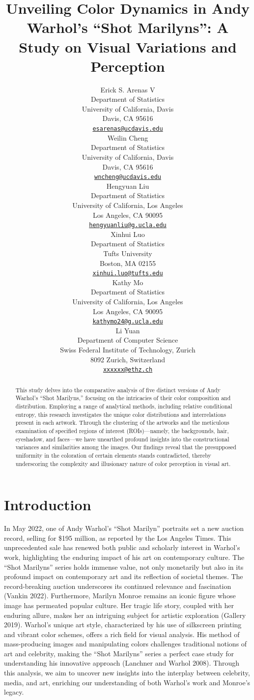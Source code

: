 \documentclass{article}
\title{Unveiling Color Dynamics in Andy Warhol's ``Shot Marilyns'': A
Study on Visual Variations and Perception}
\author{
    Erick S. Arenas V
   \\
    Department of Statistics \\
    University of California, Davis \\
  Davis, CA 95616 \\
  \texttt{\href{mailto:esarenas@ucdavis.edu}{\nolinkurl{esarenas@ucdavis.edu}}} \\
   \And
    Weilin Cheng
   \\
    Department of Statistics \\
    University of California, Davis \\
  Davis, CA 95616 \\
  \texttt{\href{mailto:wncheng@ucdavis.edu}{\nolinkurl{wncheng@ucdavis.edu}}} \\
   \And
    Hengyuan Liu
   \\
    Department of Statistics \\
    University of California, Los Angeles \\
  Los Angeles, CA 90095 \\
  \texttt{\href{mailto:hengyuanliu@g.ucla.edu}{\nolinkurl{hengyuanliu@g.ucla.edu}}} \\
   \And
    Xinhui Luo
   \\
    Department of Statistics \\
    Tufts University \\
  Boston, MA 02155 \\
  \texttt{\href{mailto:xinhui.luo@tufts.edu}{\nolinkurl{xinhui.luo@tufts.edu}}} \\
   \And
    Kathy Mo
   \\
    Department of Statistics \\
    University of California, Los Angeles \\
  Los Angeles, CA 90095 \\
  \texttt{\href{mailto:kathymo24@g.ucla.edu}{\nolinkurl{kathymo24@g.ucla.edu}}} \\
   \And
    Li Yuan
   \\
    Department of Computer Science \\
    Swiss Federal Institute of Technology, Zurich \\
  8092 Zurich, Switzerland \\
  \texttt{\href{mailto:xxxxxx@ethz.ch}{\nolinkurl{xxxxxx@ethz.ch}}} \\
  }
\begin{document}
\maketitle


\begin{abstract}
This study delves into the comparative analysis of five distinct
versions of Andy Warhol's ``Shot Marilyns,'' focusing on the intricacies
of their color composition and distribution. Employing a range of
analytical methods, including relative conditional entropy, this
research investigates the unique color distributions and interrelations
present in each artwork. Through the clustering of the artworks and the
meticulous examination of specified regions of interest (ROIs)---namely,
the backgrounds, hair, eyeshadow, and faces---we have unearthed profound
insights into the constructional variances and similarities among the
images. Our findings reveal that the presupposed uniformity in the
coloration of certain elements stands contradicted, thereby underscoring
the complexity and illusionary nature of color perception in visual art.
\end{abstract}


\hypertarget{introduction}{%
\section{Introduction}\label{introduction}}

In May 2022, one of Andy Warhol's ``Shot Marilyn'' portraits set a new
auction record, selling for \$195 million, as reported by the Los
Angeles Times. This unprecedented sale has renewed both public and
scholarly interest in Warhol's work, highlighting the enduring impact of
his art on contemporary culture. The ``Shot Marilyns'' series holds
immense value, not only monetarily but also in its profound impact on
contemporary art and its reflection of societal themes. The
record-breaking auction underscores its continued relevance and
fascination (Vankin 2022). Furthermore, Marilyn Monroe remains an iconic
figure whose image has permeated popular culture. Her tragic life story,
coupled with her enduring allure, makes her an intriguing subject for
artistic exploration (Gallery 2019). Warhol's unique art style,
characterized by his use of silkscreen printing and vibrant color
schemes, offers a rich field for visual analysis. His method of
mass-producing images and manipulating colors challenges traditional
notions of art and celebrity, making the ``Shot Marilyns'' series a
perfect case study for understanding his innovative approach (Lanchner
and Warhol 2008). Through this analysis, we aim to uncover new insights
into the interplay between celebrity, media, and art, enriching our
understanding of both Warhol's work and Monroe's legacy.
\end{document}
